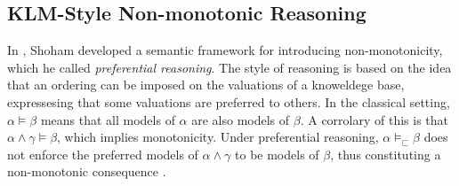 

\subsection{KLM-Style Non-monotonic Reasoning}
\label{subsection: non-monotonic reasoning}

In \cite{shoham1987nonmonotonic,shoham1987reasoning}, Shoham developed a semantic framework for introducing non-monotonicity, which he called \textit{preferential reasoning}. The style of reasoning is based on the idea that an ordering can be imposed on the valuations of a knoweldege base, expressesing that some valuations are preferred to others.
%
In the classical setting, $\alpha \vDash \beta$ means that all models of $\alpha$ are also models of $\beta$. A corrolary of this is that $\alpha \wedge \gamma \vDash \beta$, which implies monotonicity. Under preferential reasoning, $\alpha \vDash_\sqsubset \beta$ does not enforce the preferred models of $\alpha \wedge \gamma$ to be models of $\beta$, thus constituting a non-monotonic consequence \cite{shoham1987nonmonotonic}.

